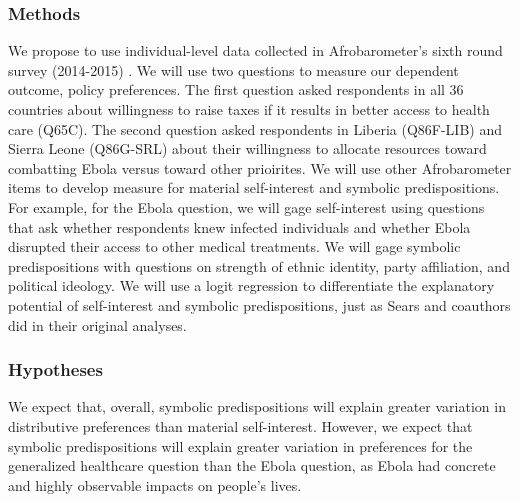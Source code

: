 \documentclass[]{article}
\begin{document}
\subsubsection{Methods}\label{methods}

We propose to use individual-level data collected in Afrobarometer's
sixth round survey (2014-2015) . We will use two questions to measure
our dependent outcome, policy preferences. The first question asked
respondents in all 36 countries about willingness to raise taxes if it
results in better access to health care (Q65C). The second question
asked respondents in Liberia (Q86F-LIB) and Sierra Leone (Q86G-SRL)
about their willingness to allocate resources toward combatting Ebola
versus toward other prioirites. We will use other Afrobarometer items to
develop measure for material self-interest and symbolic predispositions.
For example, for the Ebola question, we will gage self-interest using
questions that ask whether respondents knew infected individuals and
whether Ebola disrupted their access to other medical treatments. We
will gage symbolic predispositions with questions on strength of ethnic
identity, party affiliation, and political ideology. We will use a logit
regression to differentiate the explanatory potential of self-interest
and symbolic predispositions, just as Sears and coauthors did in their
original analyses.

\subsubsection{Hypotheses}\label{hypotheses}

We expect that, overall, symbolic predispositions will explain greater
variation in distributive preferences than material self-interest.
However, we expect that symbolic predispositions will explain greater
variation in preferences for the generalized healthcare question than
the Ebola question, as Ebola had concrete and highly observable impacts
on people's lives.
\end{document}
